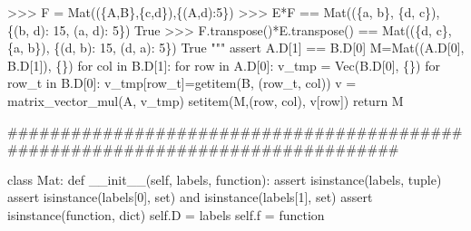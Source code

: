 \documentclass[
  letterpaper,
  DIV=11,
  numbers=noendperiod]{scrartcl}
\newenvironment{Shaded}{\begin{snugshade}}{\end{snugshade}}
\newcommand{\BuiltInTok}[1]{\textcolor[rgb]{0.00,0.23,0.31}{#1}}
\newcommand{\CommentTok}[1]{\textcolor[rgb]{0.37,0.37,0.37}{#1}}
\newcommand{\ControlFlowTok}[1]{\textcolor[rgb]{0.00,0.23,0.31}{#1}}
\newcommand{\DecValTok}[1]{\textcolor[rgb]{0.68,0.00,0.00}{#1}}
\newcommand{\FunctionTok}[1]{\textcolor[rgb]{0.28,0.35,0.67}{#1}}
\newcommand{\KeywordTok}[1]{\textcolor[rgb]{0.00,0.23,0.31}{#1}}
\newcommand{\NormalTok}[1]{\textcolor[rgb]{0.00,0.23,0.31}{#1}}
\newcommand{\OperatorTok}[1]{\textcolor[rgb]{0.37,0.37,0.37}{#1}}
\newcommand{\VariableTok}[1]{\textcolor[rgb]{0.07,0.07,0.07}{#1}}
\begin{document}
\begin{Shaded}
\begin{Highlighting}[numbers=left,,]
\CommentTok{    \textgreater{}\textgreater{}\textgreater{} F = Mat((\{\textquotesingle{}A\textquotesingle{},\textquotesingle{}B\textquotesingle{}\},\{\textquotesingle{}c\textquotesingle{},\textquotesingle{}d\textquotesingle{}\}),\{(\textquotesingle{}A\textquotesingle{},\textquotesingle{}d\textquotesingle{}):5\})}
\CommentTok{    \textgreater{}\textgreater{}\textgreater{} E*F == Mat((\{\textquotesingle{}a\textquotesingle{}, \textquotesingle{}b\textquotesingle{}\}, \{\textquotesingle{}d\textquotesingle{}, \textquotesingle{}c\textquotesingle{}\}), \{(\textquotesingle{}b\textquotesingle{}, \textquotesingle{}d\textquotesingle{}): 15, (\textquotesingle{}a\textquotesingle{}, \textquotesingle{}d\textquotesingle{}): 5\})}
\CommentTok{    True}
\CommentTok{    \textgreater{}\textgreater{}\textgreater{} F.transpose()*E.transpose() == Mat((\{\textquotesingle{}d\textquotesingle{}, \textquotesingle{}c\textquotesingle{}\}, \{\textquotesingle{}a\textquotesingle{}, \textquotesingle{}b\textquotesingle{}\}), \{(\textquotesingle{}d\textquotesingle{}, \textquotesingle{}b\textquotesingle{}): 15, (\textquotesingle{}d\textquotesingle{}, \textquotesingle{}a\textquotesingle{}): 5\})}
\CommentTok{    True}
\CommentTok{    """}
    \ControlFlowTok{assert}\NormalTok{ A.D[}\DecValTok{1}\NormalTok{] }\OperatorTok{==}\NormalTok{ B.D[}\DecValTok{0}\NormalTok{]}
\NormalTok{    M}\OperatorTok{=}\NormalTok{Mat((A.D[}\DecValTok{0}\NormalTok{], B.D[}\DecValTok{1}\NormalTok{]), \{\})}
    \ControlFlowTok{for}\NormalTok{ col }\KeywordTok{in}\NormalTok{ B.D[}\DecValTok{1}\NormalTok{]:}
        \ControlFlowTok{for}\NormalTok{ row }\KeywordTok{in}\NormalTok{ A.D[}\DecValTok{0}\NormalTok{]:}
\NormalTok{            v\_tmp }\OperatorTok{=}\NormalTok{ Vec(B.D[}\DecValTok{0}\NormalTok{], \{\})}
            \ControlFlowTok{for}\NormalTok{ row\_t }\KeywordTok{in}\NormalTok{ B.D[}\DecValTok{0}\NormalTok{]:}
\NormalTok{                v\_tmp[row\_t]}\OperatorTok{=}\NormalTok{getitem(B, (row\_t, col))}
\NormalTok{            v }\OperatorTok{=}\NormalTok{ matrix\_vector\_mul(A, v\_tmp)}
\NormalTok{            setitem(M,(row, col), v[row]) }
    \ControlFlowTok{return}\NormalTok{ M}

\CommentTok{\#\#\#\#\#\#\#\#\#\#\#\#\#\#\#\#\#\#\#\#\#\#\#\#\#\#\#\#\#\#\#\#\#\#\#\#\#\#\#\#\#\#\#\#\#\#\#\#\#\#\#\#\#\#\#\#\#\#\#\#\#\#\#\#\#\#\#\#\#\#\#\#\#\#\#\#\#\#\#\#}

\KeywordTok{class}\NormalTok{ Mat:}
    \KeywordTok{def} \FunctionTok{\_\_init\_\_}\NormalTok{(}\VariableTok{self}\NormalTok{, labels, function):}
        \ControlFlowTok{assert} \BuiltInTok{isinstance}\NormalTok{(labels, }\BuiltInTok{tuple}\NormalTok{)}
        \ControlFlowTok{assert} \BuiltInTok{isinstance}\NormalTok{(labels[}\DecValTok{0}\NormalTok{], }\BuiltInTok{set}\NormalTok{) }\KeywordTok{and} \BuiltInTok{isinstance}\NormalTok{(labels[}\DecValTok{1}\NormalTok{], }\BuiltInTok{set}\NormalTok{)}
        \ControlFlowTok{assert} \BuiltInTok{isinstance}\NormalTok{(function, }\BuiltInTok{dict}\NormalTok{)}
        \VariableTok{self}\NormalTok{.D }\OperatorTok{=}\NormalTok{ labels}
        \VariableTok{self}\NormalTok{.f }\OperatorTok{=}\NormalTok{ function}


\end{Highlighting}
\end{Shaded}
\end{document}
